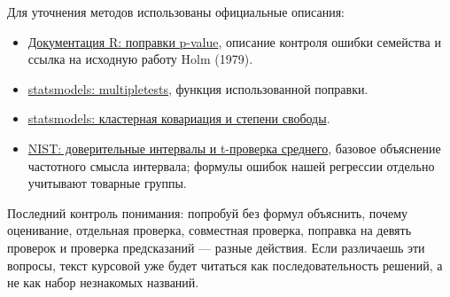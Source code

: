 \documentclass[12pt,a4paper]{article}
\begin{document}
Для уточнения методов использованы официальные описания:
\begin{itemize}
\item \href{https://stat.ethz.ch/R-manual/R-devel/library/stats/html/p.adjust.html}{Документация R: поправки p-value}, описание контроля ошибки семейства и ссылка на исходную работу Holm (1979).
\item \href{https://www.statsmodels.org/stable/generated/statsmodels.stats.multitest.multipletests.html}{statsmodels: multipletests}, функция использованной поправки.
\item \href{https://www.statsmodels.org/stable/generated/statsmodels.regression.linear_model.RegressionResults.get_robustcov_results.html}{statsmodels: кластерная ковариация и степени свободы}.
\item \href{https://www.itl.nist.gov/div898/handbook/eda/section3/eda352.htm}{NIST: доверительные интервалы и t-проверка среднего}, базовое объяснение частотного смысла интервала; формулы ошибок нашей регрессии отдельно учитывают товарные группы.
\end{itemize}

Последний контроль понимания: попробуй без формул объяснить, почему оценивание, отдельная проверка, совместная проверка, поправка на девять проверок и проверка предсказаний --- разные действия. Если различаешь эти вопросы, текст курсовой уже будет читаться как последовательность решений, а не как набор незнакомых названий.
\end{document}
